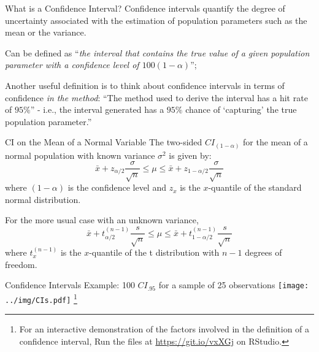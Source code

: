 
\begin{frame}{What is a Confidence Interval?}
Confidence intervals quantify the degree of uncertainty associated with the estimation of population parameters such as the mean or the variance.\bigskip

Can be defined as ``\textit{the interval that contains the true value of a given population parameter with a confidence level of $100(1-\alpha)$}'';\bigskip

Another useful definition is to think about confidence intervals in terms of confidence \textit{in the method}: ``The method used to derive the interval has a hit rate of $95\%$'' - i.e., the interval generated has a $95\%$ chance of `capturing' the true population parameter.''
\end{frame}





\begin{frame}{CI on the Mean of a Normal Variable}
The two-sided $CI_{(1-\alpha)}$ for the mean of a normal population with known variance $\sigma^2$ is given by:
\begin{equation*}
\bar{x}+z_{\alpha/2}\frac{\sigma}{\sqrt{n}}\leq\mu\leq\bar{x}+z_{1-\alpha/2}\frac{\sigma}{\sqrt{n}}
\end{equation*}
\noindent where $(1-\alpha)$ is the confidence level and $z_{x}$ is the $x$-quantile of the standard normal distribution.
\bigskip

For the more usual case with an unknown variance,
\begin{equation*}
\bar{x}+t_{\alpha/2}^{(n-1)}\frac{s}{\sqrt{n}}\leq\mu\leq\bar{x}+t_{1-\alpha/2}^{(n-1)}\frac{s}{\sqrt{n}}
\end{equation*}
\noindent where $t_{x}^{(n-1)}$ is the $x$-quantile of the t distribution with $n-1$ degrees of freedom.
\end{frame}

\begin{frame}
{Confidence Intervals}
{Example: 100 $CI_{.95}$ for a sample of 25 observations}
\centering\texttt{[image: ../img/CIs.pdf]}
\footnote{For an interactive demonstration of the factors involved in the definition of a confidence interval, Run the files at \url{https://git.io/vxXGj} on RStudio.}
\end{frame}


